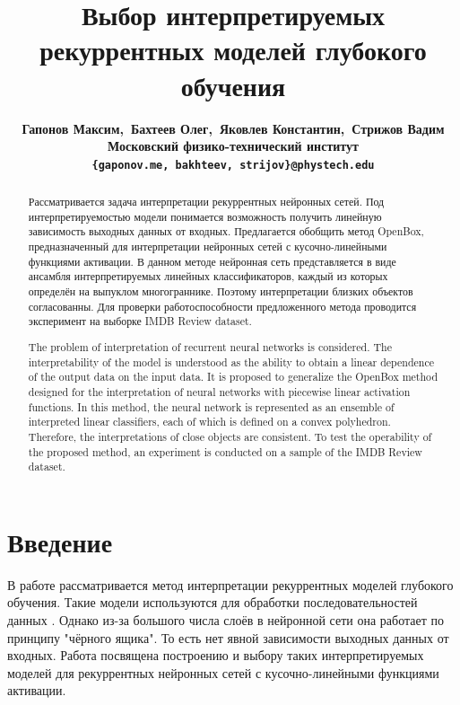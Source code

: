 \documentclass[a4paper, 12pt]{article}
\renewcommand{\abstractname}{Аннотация}
\begin{document}
\title{Выбор интерпретируемых рекуррентных моделей глубокого обучения}
\author{\normalsize\bf{Гапонов Максим,~Бахтеев Олег,~Яковлев Константин,~Стрижов Вадим} \\
	Московский физико-технический институт \\
	\texttt{\{gaponov.me,~bakhteev,~strijov\}@phystech.edu}
}
\date{}
\maketitle
\begin{abstract}
Рассматривается задача интерпретации рекуррентных нейронных сетей. Под интерпретируемостью модели понимается возможность получить линейную зависимость выходных данных от входных. Предлагается обобщить метод OpenBox, предназначенный для интерпретации нейронных сетей с кусочно-линейными функциями активации. В данном методе нейронная сеть представляется в виде ансамбля интерпретируемых линейных классификаторов, каждый из которых определён на выпуклом многограннике. Поэтому интерпретации близких объектов согласованны. Для проверки работоспособности предложенного метода проводится эксперимент на выборке IMDB Review dataset.
\end{abstract}
\renewcommand{\abstractname}{Abstract}
\begin{abstract}
The problem of interpretation of recurrent neural networks is considered. The interpretability of the model is understood as the ability to obtain a linear dependence of the output data on the input data. It is proposed to generalize the OpenBox method designed for the interpretation of neural networks with piecewise linear activation functions. In this method, the neural network is represented as an ensemble of interpreted linear classifiers, each of which is defined on a convex polyhedron. Therefore, the interpretations of close objects are consistent. To test the operability of the proposed method, an experiment is conducted on a sample of the IMDB Review dataset.
\end{abstract}


\section{Введение}
В работе рассматривается метод интерпретации рекуррентных моделей глубокого обучения. Такие модели используются для обработки последовательностей данных \cite{lipton2015critical}. Однако из-за большого числа слоёв в нейронной сети она работает по принципу "чёрного ящика". То есть нет явной зависимости выходных данных от входных. Работа посвящена построению и выбору таких интерпретируемых моделей для рекуррентных нейронных сетей с кусочно-линейными функциями активации.
\end{document}
